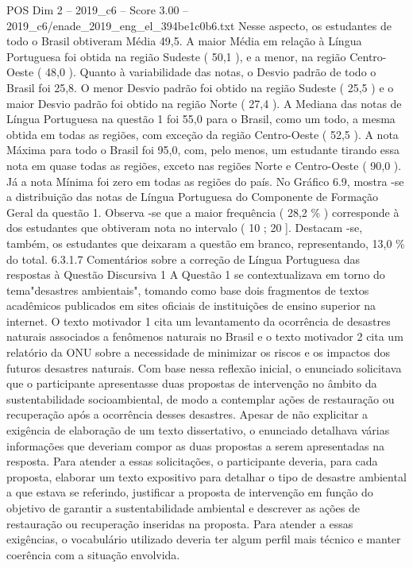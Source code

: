 \begin{textsample}{POS Dim 2 – 2019\_c6 – Score 3.00 – 2019\_c6/enade\_2019\_eng\_el\_394be1c0b6.txt}
Nesse aspecto, os estudantes de todo o Brasil obtiveram Média 49,5.
A maior Média em relação à Língua Portuguesa foi obtida na região Sudeste ( 50,1 ), e a menor, na região Centro-Oeste ( 48,0 ).
Quanto à variabilidade das notas, o Desvio padrão de todo o Brasil foi 25,8.
O menor Desvio padrão foi obtido na região Sudeste ( 25,5 ) e o maior Desvio padrão foi obtido na região Norte ( 27,4 ).
A Mediana das notas de Língua Portuguesa na questão 1 foi 55,0 para o Brasil, como um todo, a mesma obtida em todas as regiões, com exceção da região Centro-Oeste ( 52,5 ).
A nota Máxima para todo o Brasil foi 95,0, com, pelo menos, um estudante tirando essa nota em quase todas as regiões, exceto nas regiões Norte e Centro-Oeste ( 90,0 ).
Já a nota Mínima foi zero em todas as regiões do país.
No Gráfico 6.9, mostra -se a distribuição das notas de Língua Portuguesa do Componente de Formação Geral da questão 1.
Observa -se que a maior frequência ( 28,2 \% ) corresponde à dos estudantes que obtiveram nota no intervalo ( 10 ; 20 ].
Destacam -se, também, os estudantes que deixaram a questão em branco, representando, 13,0 \% do total. 6.3.1.7 Comentários sobre a correção de Língua Portuguesa das respostas à Questão Discursiva 1 A Questão 1 se contextualizava em torno do tema"desastres ambientais", tomando como base dois fragmentos de textos acadêmicos publicados em sites oficiais de instituições de ensino superior na internet.
O texto motivador 1 cita um levantamento da ocorrência de desastres naturais associados a fenômenos naturais no Brasil e o texto motivador 2 cita um relatório da ONU sobre a necessidade de minimizar os riscos e os impactos dos futuros desastres naturais.
Com base nessa reflexão inicial, o enunciado solicitava que o participante apresentasse duas propostas de intervenção no âmbito da sustentabilidade socioambiental, de modo a contemplar ações de restauração ou recuperação após a ocorrência desses desastres.
Apesar de não explicitar a exigência de elaboração de um texto dissertativo, o enunciado detalhava várias informações que deveriam compor as duas propostas a serem apresentadas na resposta.
Para atender a essas solicitações, o participante deveria, para cada proposta, elaborar um texto expositivo para detalhar o tipo de desastre ambiental a que estava se referindo, justificar a proposta de intervenção em função do objetivo de garantir a sustentabilidade ambiental e descrever as ações de restauração ou recuperação inseridas na proposta.
Para atender a essas exigências, o vocabulário utilizado deveria ter algum perfil mais técnico e manter coerência com a situação envolvida.

\end{textsample}
